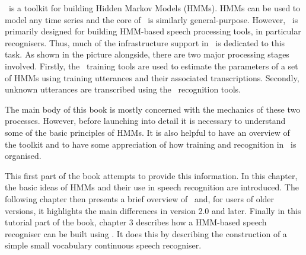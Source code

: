 %
%


\HTK\ is a toolkit for building Hidden Markov Models (HMMs). 
HMMs can be used to model any time series and the core of 
\HTK\ is similarly general-purpose. However, \HTK\ is primarily
designed for building HMM-based speech processing tools,  in
particular recognisers.  Thus, much of the infrastructure
support in \HTK\ is dedicated to this task.  As shown in the picture
alongside, there are two major processing stages involved.  Firstly,
the \HTK\ training tools are used to estimate the parameters of a set
of HMMs using 
training utterances and their associated transcriptions. Secondly,
unknown utterances are transcribed using the \HTK\ recognition tools.


The main body of this book is mostly concerned with the mechanics of these
two processes. However, before launching into detail it is necessary to
understand some of the basic principles of HMMs.  It is also helpful to have
an overview of the toolkit and to have some appreciation of 
how training and recognition in \HTK\ is organised. 

This first part of the book attempts to provide this information. In this
chapter, the basic ideas of HMMs and their use in speech recognition are
introduced.  The following chapter then presents a brief overview
of \HTK\ and, for users of older versions, it highlights the main
differences in version 2.0 and later.  Finally in this tutorial part of the book, chapter 3
describes how a HMM-based speech
recogniser can be built using
\HTK.  It does this by describing the construction of a simple small vocabulary
continuous speech recogniser.

